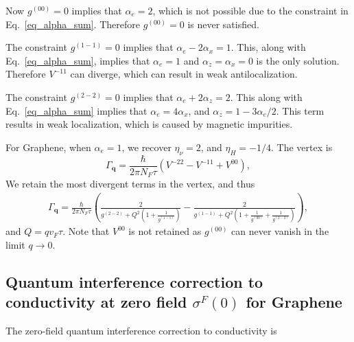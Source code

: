 \documentclass[aps,prb,amsmath,amssymb,footinbib,showpacs,twocolumn]{revtex4-2}
\begin{document}
\begin{widetext}
Now $g^{(00)}=0$ implies that $\alpha_e=2$, which is not possible due to the constraint in Eq.~\ref{eq_alpha_sum}. Therefore $g^{(00)}=0$ is never satisfied. 

The constraint $g^{(1-1)}=0$ implies that $\alpha_e-2\alpha_x=1$. This, along with Eq.~\ref{eq_alpha_sum}, implies that $\alpha_e=1$ and $\alpha_z=\alpha_x=0$ is the only solution. Therefore $V^{-11}$ can diverge, which can result in weak antilocalization. 

The constraint $g^{(2-2)}=0$ implies that $\alpha_e+2\alpha_z=2$. This along with Eq.~\ref{eq_alpha_sum} implies that $\alpha_e=4\alpha_x$, and $\alpha_z=1-3\alpha_e/2$. This term results in weak localization, which is caused by magnetic impurities. 

For Graphene, when $\alpha_e=1$, we recover $\eta_\nu=2$, and $\eta_H=-1/4$. The vertex is 
\begin{equation}
    \Gamma_{\mathbf{q}}=\frac{\hbar}{2\pi N_{F}\tau}\left(V^{-22}-V^{-11}+V^{00}\right),
\end{equation}
We retain the most divergent terms in the vertex, and thus 
\begin{align}
    \Gamma_{\mathbf{q}}=\frac{\hbar}{2\pi N_{F}\tau}\left(\frac{2}{g^{(2-2)}+Q^2\left(1+\frac{1}{g^{(1-1)}}\right)}-\frac{2}{g^{(1-1)}+Q^2\left(1+\frac{1}{g^{(00)}}+\frac{1}{g^{(2-2)}}\right)}\right),
\end{align}
and $Q=qv_{F}\tau$. 
Note that $V^{00}$ is not retained as $g^{(00)}$ can never vanish in the limit $q\rightarrow 0$. 
\subsection{Quantum interference correction to conductivity
at zero field $\sigma^{F}(0)$ for Graphene}
The zero-field quantum interference correction to conductivity is


\end{widetext}
\end{document}
